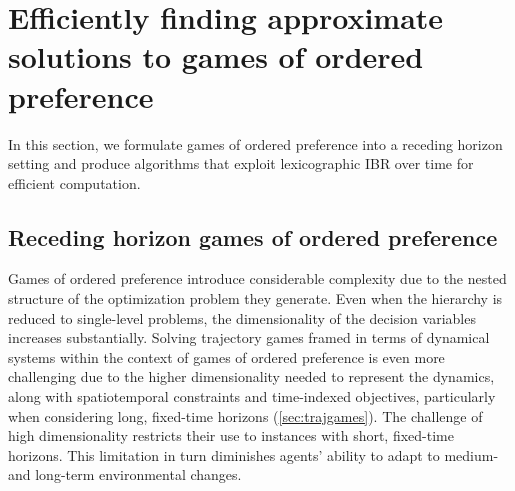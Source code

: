 \chapter{Efficiently finding approximate solutions to games of ordered preference}
\label{ch:lex-ibr-ot}

In this section, we formulate games of ordered preference into a receding horizon setting
and produce algorithms that exploit lexicographic IBR over time for efficient computation.

\section{Receding horizon games of ordered preference}
\label{sec:rhgoop}

Games of ordered preference introduce considerable complexity due
to the nested structure of the optimization problem they generate.
Even when the hierarchy is reduced
to single-level problems, the dimensionality
of the decision variables increases substantially.
Solving trajectory games framed
in terms of dynamical systems within the context
of games of ordered preference is even more challenging due
to the higher dimensionality needed to represent the dynamics, along with spatiotemporal constraints
and time-indexed objectives, particularly when considering long, fixed-time horizons (\cref{sec:trajgames}).
The challenge of high dimensionality restricts their use
to instances with short, fixed-time horizons.
This limitation in turn diminishes agents' ability
to adapt to medium- and long-term environmental changes.

